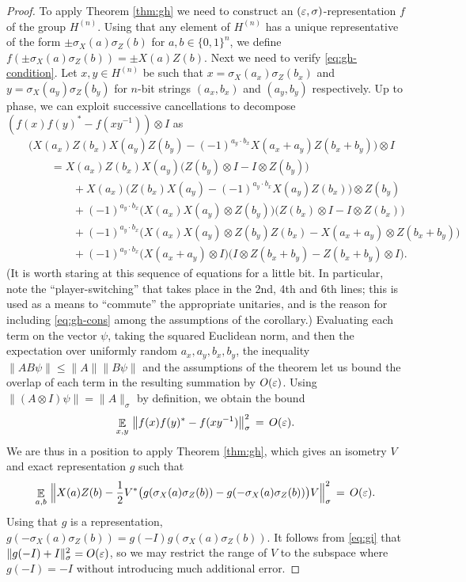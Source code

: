 \begin{proof} 
To apply Theorem \ref{thm:gh} we need to construct an $(\varepsilon,\sigma)$-representation $f$ of the group $H^{(n)}$. Using that any element of $H^{(n)}$ has a unique representative of the form $\pm \sigma_X(a)\sigma_Z(b)$ for $a,b\in\{0,1\}^n$, we define $f(\pm \sigma_X(a)\sigma_Z(b)) = \pm X(a)Z(b)$. Next we need to verify \eqref{eq:gh-condition}. Let $x,y\in H^{(n)}$ be such that $x=\sigma_X(a_x)\sigma_Z(b_x)$ and $y=\sigma_X(a_y)\sigma_Z(b_y)$ for $n$-bit strings $(a_x,b_x)$ and $(a_y,b_y)$ respectively. Up to phase, we can exploit successive cancellations to decompose $(f(x)f(y)^*-f(xy^{-1}))\otimes I$ as
\begin{eqnarray*}
&&\big( X(a_x)Z(b_x)X(a_y)Z(b_y) -(-1)^{a_y\cdot b_x} X(a_x+a_y) Z(b_x+b_y)\big)\otimes I \\ 
&&\qquad =  X(a_x)Z(b_x)X(a_y)\big (Z(b_y)\otimes I - I\otimes Z(b_y)\big)\\
&& \qquad\qquad+ X(a_x)\big(Z(b_x)X(a_y) - (-1)^{a_y\cdot b_x} X(a_y)Z(b_x)\big)\otimes Z(b_y)\\
&& \qquad\qquad+(-1)^{a_y\cdot b_x} \big( X(a_x)X(a_y)\otimes Z(b_y)\big) \big( Z(b_x)\otimes I - I\otimes Z(b_x)\big)\\
&& \qquad\qquad+  (-1)^{a_y\cdot b_x}  \big( X(a_x)X(a_y)\otimes Z(b_y)Z(b_x) - X(a_x+a_y)\otimes Z(b_x+b_y)\big)\\
&& \qquad\qquad+  (-1)^{a_y\cdot b_x} \big(  X(a_x+a_y)\otimes I \big)\big(I\otimes Z(b_x+b_y) - Z(b_x+b_y)\otimes I\big).
\end{eqnarray*}
(It is worth staring at this sequence of equations for a little bit. In particular, note the ``player-switching'' that takes place in the 2nd, 4th and 6th lines; this is used as a means to ``commute'' the appropriate unitaries, and is the reason for including \eqref{eq:gh-cons} among the assumptions of the corollary.)
Evaluating each term on the vector $\psi$, taking the squared Euclidean norm, and then the expectation over uniformly random $a_x,a_y,b_x,b_y$, the inequality $\| AB\psi\| \leq \|A\|\|B\psi\|$ and the assumptions of the theorem let us bound the overlap of each term in the resulting summation by $O({\varepsilon})$. Using $\| (A\otimes I) \psi\| = \|A\|_\sigma$ by definition, we obtain the bound
$$ \mathop{\mathbb{E}}\displaylimits_{x,y}\,\big\|f(x)f(y)^* - f(xy^{-1})\big\|_\sigma^2 \,=\, O({\varepsilon}).$$
We are thus in a position to apply Theorem \ref{thm:gh}, which gives an isometry $V$ and exact representation $g$ such that
\begin{equation}\label{eq:gi}
\mathop{\mathbb{E}}\displaylimits_{a,b}\,\Big\|  X(a)Z(b)- \frac{1}{2}V^*\big( g(\sigma_X(a)\sigma_Z(b))  -  g(-\sigma_X(a)\sigma_Z(b))\big)V\Big\|_\sigma^2 \,=\, O({\varepsilon}). 
\end{equation}
Using that $g$ is a representation, $g(-\sigma_X(a)\sigma_Z(b)) = g(-I)g(\sigma_X(a)\sigma_Z(b))$. It follows from \eqref{eq:gi} that $\|g(-I) + I \|_\sigma^2 = O({\varepsilon})$, so we may restrict the range of $V$ to the subspace where $g(-I)=-I$ without introducing much additional error. 
\end{proof}


